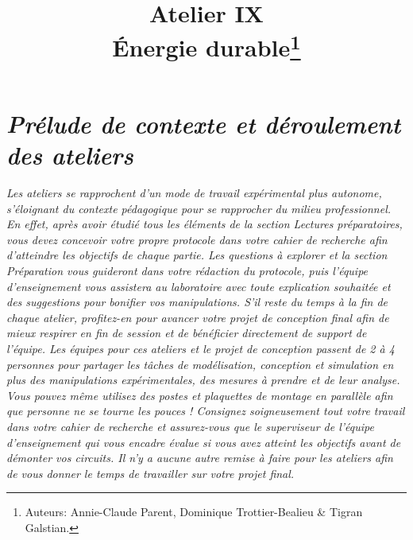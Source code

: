 \documentclass[canadien,12pt,oneside,letterpaper]{article}
\title{\textbf{Atelier IX}\\Énergie durable\thanks{Auteurs: Annie-Claude Parent, Dominique Trottier-Bealieu \& Tigran Galstian.}}
\date{}
\begin{document}
\maketitle \vspace{-17ex}
\section{\textit{\textbf{Prélude de contexte et déroulement des ateliers}}}
\vspace{-2ex}
\textit{Les ateliers se rapprochent d’un mode de travail expérimental plus autonome,
s’éloignant du contexte pédagogique pour se rapprocher du milieu professionnel. En
effet, après avoir étudié tous les éléments de la section Lectures préparatoires, vous
devez concevoir votre propre protocole dans votre cahier de recherche afin d’atteindre
les objectifs de chaque partie. Les questions à explorer et la section Préparation vous
guideront dans votre rédaction du protocole, puis l’équipe d’enseignement vous assistera
au laboratoire avec toute explication souhaitée et des suggestions pour bonifier
vos manipulations. S’il reste du temps à la fin de chaque atelier, profitez-en pour
avancer votre projet de conception final afin de mieux respirer en fin de session et
de bénéficier directement de support de l’équipe.
Les équipes pour ces ateliers et le projet de conception passent de 2 à 4 personnes
pour partager les tâches de modélisation, conception et simulation en plus des manipulations
expérimentales, des mesures à prendre et de leur analyse. Vous pouvez
même utilisez des postes et plaquettes de montage en parallèle afin que personne ne
se tourne les pouces ! Consignez soigneusement tout votre travail dans votre cahier
de recherche et assurez-vous que le superviseur de l’équipe d’enseignement qui vous
encadre évalue si vous avez atteint les objectifs avant de démonter vos circuits. Il
n’y a aucune autre remise à faire pour les ateliers afin de vous donner le temps de
travailler sur votre projet final.}
\end{document}
